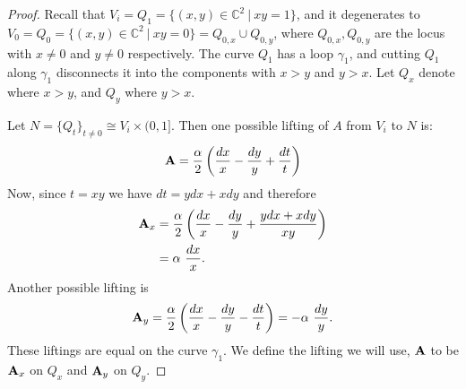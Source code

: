 	\begin{proof}
		Recall that $V_i=Q_1 = \{(x,y)\in \mathbb{C}^2~|~ xy=1\}$, and it degenerates to $V_0 = Q_0 = \{(x,y)\in\mathbb{C}^2~|~xy=0\} = Q_{0,x} \cup Q_{0,y}$, where $Q_{0,x},Q_{0,y}$ are the locus with $x\neq0$ and $y\neq 0$ respectively. The curve $Q_1$ has a loop $\gamma_1$, and cutting $Q_1$ along $\gamma_1$ disconnects it into the components with $x>y$ and $y>x$. Let $Q_x$ denote where $x>y$, and $Q_y$ where $y>x$.
		
		Let $N=\{Q_t\}_{t\neq 0}\cong V_i\times(0,1]$. Then one possible lifting of $A$ from $V_i$ to $N$ is:
		\begin{equation}
			\mathbf{A} = \frac{\alpha}{2}\left(\frac{dx}{x}-\frac{dy}{y} + \frac{dt}{t}\right)
		\end{equation}
		Now, since $t=xy$ we have $dt =ydx+xdy$ and therefore
		\begin{align*}
			\mathbf{A}_x &= \frac{\alpha}{2}\left(\frac{dx}{x}-\frac{dy}{y} + \frac{ydx+xdy}{xy}\right)\\
			&= \alpha~ \frac{dx}{x}.
		\end{align*}
		Another possible lifting is 
		\begin{equation}
			\mathbf{A}_y = \frac{\alpha}{2}\left(\frac{dx}{x}-\frac{dy}{y} -  \frac{dt}{t}\right) = -\alpha~\frac{dy}{y}.
		\end{equation}
		These liftings are equal on the curve $\gamma_1$. We define the lifting we will use, $\mathbf{A}$ to be $\mathbf{A}_x$ on $Q_x$ and $\mathbf{A}_y$ on $Q_y$.
		

\end{proof}
